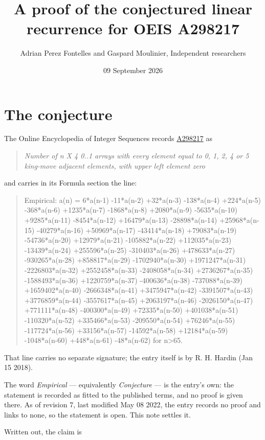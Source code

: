 \documentclass[11pt]{article}
\title{A proof of the conjectured linear recurrence for OEIS A298217}
\author{Adrian Perez Fontelles and Gaspard Moulinier, Independent researchers}
\date{09 September 2026}
\theoremstyle{definition}
\begin{document}
\maketitle
\section{The conjecture}

The Online Encyclopedia of Integer Sequences records \href{https://oeis.org/A298217}{A298217} as

\begin{quote}\itshape Number of n X 4 0..1 arrays with every element equal to 0, 1, 2, 4 or 5 king-move adjacent elements, with upper left element zero\end{quote}

and carries in its Formula section the line:

\begin{quote}\ttfamily Empirical: a(n) = 6*a(n-1) -11*a(n-2) +32*a(n-3) -138*a(n-4) +224*a(n-5) -368*a(n-6) +1235*a(n-7) -1868*a(n-8) +2080*a(n-9) -5635*a(n-10) +9285*a(n-11) -8454*a(n-12) +16479*a(n-13) -28898*a(n-14) +25968*a(n-15) -40279*a(n-16) +50969*a(n-17) -43414*a(n-18) +79083*a(n-19) -54736*a(n-20) +12979*a(n-21) -105882*a(n-22) +112035*a(n-23) -13439*a(n-24) +255596*a(n-25) -310403*a(n-26) +478633*a(n-27) -930265*a(n-28) +858817*a(n-29) -1702940*a(n-30) +1971247*a(n-31) -2226803*a(n-32) +2552458*a(n-33) -2408058*a(n-34) +2736267*a(n-35) -1588493*a(n-36) +1220759*a(n-37) -400636*a(n-38) -737088*a(n-39) +1659402*a(n-40) -2666348*a(n-41) +3475947*a(n-42) -3391507*a(n-43) +3776859*a(n-44) -3557617*a(n-45) +2063197*a(n-46) -2026150*a(n-47) +771111*a(n-48) -400300*a(n-49) +72335*a(n-50) +401038*a(n-51) -110320*a(n-52) +335466*a(n-53) -209550*a(n-54) +76246*a(n-55) -117724*a(n-56) +33156*a(n-57) -14592*a(n-58) +12184*a(n-59) -1048*a(n-60) +448*a(n-61) -48*a(n-62) for n>65.\end{quote}

That line carries no separate signature; the entry itself is by R. H. Hardin (Jan 15 2018).

The word {\itshape Empirical} --- equivalently {\itshape Conjecture} --- is the entry's own: the statement is recorded as fitted to the published terms, and no proof is given there. As of revision 7, last modified May 08 2022, the entry records no proof and links to none, so the statement is open. This note settles it.

Written out, the claim is
\end{document}
